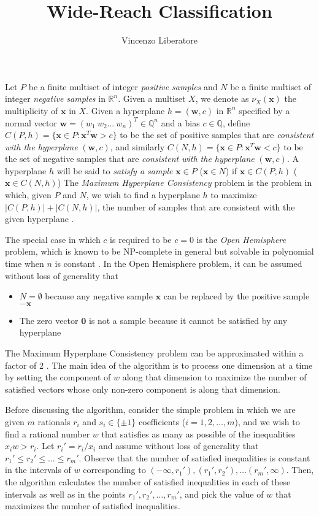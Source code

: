 \documentclass[11pt]{article}
\title{Wide-Reach Classification}
\author{Vincenzo Liberatore}
\theoremstyle{definition}
\newcommand{\R}{\mathbb{R}}
\newcommand{\Q}{\mathbb{Q}}
\newcommand{\vect}[1]{\mathbf{#1}}
\begin{document}
\maketitle

Let $P$ be a finite multiset of integer {\em positive samples\/} and 
$N$ be a finite multiset of integer {\em negative samples\/} in $\R^n$.
Given a multiset $X$, we denote as $\nu_X(\vect{x})$ the multiplicity of $\vect{x}$ in $X$. 
Given a hyperplane $h = (\vect{w}, c)$ in $\R^n$ 
specified by a normal vector $\vect{w} = (w_1 ~ w_2 \dots ~ w_n)^T \in \Q^n$ and a bias $c \in \Q$,
define $C(P, h) = \{ \vect{x} \in P : \vect{x}^T \vect{w} > c \}$
to be the set of positive samples that are {\em consistent with the hyperplane\/} $(\vect{w}, c)$,
and similarly $C(N, h) = \{ \vect{x} \in P : \vect{x}^T \vect{w} < c \}$
to be the set of negative samples that are {\em consistent with the hyperplane\/} $(\vect{w}, c)$.
A hyperplane $h$ will be said to {\em satisfy a sample\/} 
$\vect{x} \in P$ ($\vect{x} \in N$)
if $\vect{x} \in C(P, h)$ ($\vect{x} \in C(N, h)$)
The {\em Maximum Hyperplane Consistency\/} problem is the problem in which,
given $P$ and $N$, we wish to find a hyperplane $h$
to maximize $|C(P, h)| + |C(N, h)|$, the number of samples 
that are consistent with the given hyperplane \cite{countingapprox}.


The special case in which $c$ is required to be $c = 0$ is the {\em Open Hemisphere\/} problem,
which is known to be NP-complete in general but solvable in polynomial time
when $n$ is constant \cite{densehemisphere}.
In the Open Hemisphere problem, it can be assumed without loss of generality that 
\begin{itemize} 
\item $N = \emptyset$ because 
any negative sample $\vect{x}$ can be replaced by the positive sample $-\vect{x}$
\item The zero vector $\vect{0}$ is not a sample because it cannot be satisfied by any hyperplane
\end{itemize}

The Maximum Hyperplane Consistency problem can be approximated within a factor of 2 \cite{countingapprox}.
The main idea of the algorithm is to process one dimension at a time 
by setting the component of $w$ along that dimension to maximize the number of satisfied vectors
whose only non-zero component is along that dimension.


Before discussing the algorithm, 
consider the simple problem in which we are given $m$ rationals $r_i$ and 
$s_i \in \{ \pm 1 \}$ coefficients ($i = 1, 2, \dots, m$),
and we wish to find a rational number $w$ that satisfies as many as possible of the inequalities
$x_i w > r_i$.
Let $r_i' = r_i / x_i$ and assume without loss of generality that 
$r_1' \leq r_2' \leq \dots \leq r_m'$.
Observe that the number of satisfied inequalities is constant in the 
intervals of $w$ corresponding to
$(-\infty, r_1'), (r_1', r_2'), \dots (r_m', \infty)$.
Then, the algorithm calculates the number of satisfied inequalities in each of these intervals 
as well as in the points $r_1', r_2', \dots, r_m'$, and pick the
value of $w$ that maximizes the number of satisfied inequalities. 
\end{document}
